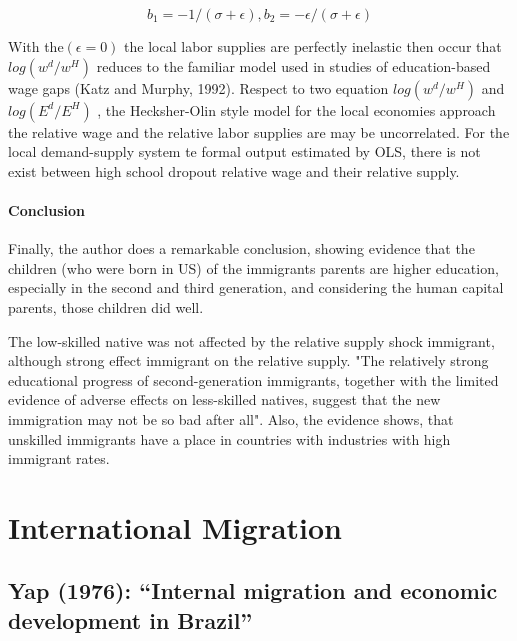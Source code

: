 \documentclass[11pt]{article}
\theoremstyle{prop}
\begin{document}
	\begin{subequations}
		\begin{equation}
			b_1=-1/(\sigma+\epsilon), b_2 = -\epsilon / (\sigma+\epsilon) 
		\end{equation}
	\end{subequations}
	
	With the$(\epsilon=0)$ the local labor supplies are perfectly inelastic then occur that $log (w^d/w^H)$ reduces to the familiar model used in studies of education-based wage gaps {\color{blue}(Katz and Murphy, 1992)}.
	Respect to two equation $log (w^d/w^H)$ and $log(E^d/E^H)$ , the {\color{blue} Hecksher-Olin} style model for the local economies approach the relative wage and the relative labor supplies are may be uncorrelated.
	For the local demand-supply system te formal output estimated by OLS, there is not exist between high school dropout relative wage and their relative supply. 
	
	\paragraph{Conclusion}
	Finally, the author does a remarkable conclusion, showing evidence that the children (who were born in US) of the immigrants parents are higher education, especially in the second and third generation, and considering the human capital parents, those children did well. 
	
	The low-skilled native was not affected by the relative supply shock immigrant, although strong effect immigrant on the relative supply. "The relatively strong educational progress of second-generation immigrants, together with the limited evidence of adverse effects on less-skilled natives, suggest that the new immigration may not be so bad after all". Also, the evidence shows, that unskilled immigrants have a place in countries with industries with high immigrant rates.
		
	
\section{International Migration}
	
	\subsection{Yap (1976): ``Internal migration and economic development in Brazil''}
	
\end{document}
